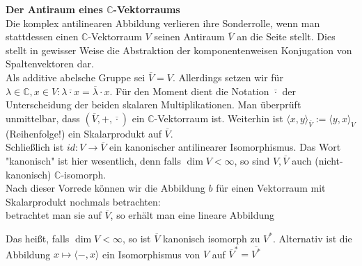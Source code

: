 \documentclass[12pt,a4paper]{article}
\theoremstyle{definition}
\theoremstyle{remark}
\renewcommand{\bar}[1]{\overline{#1}}
\begin{document}
	\textbf{Der Antiraum eines $\mathbb{C}$-Vektorraums} \\
	Die komplex antilinearen Abbildung verlieren ihre Sonderrolle, wenn man stattdessen einen $\mathbb{C}$-Vektorraum $V$ seinen Antiraum $\bar{V}$ an die Seite stellt. Dies stellt in gewisser Weise die Abstraktion der komponentenweisen Konjugation von Spaltenvektoren dar. \\
	Als additive abelsche Gruppe sei $\bar{V} = V$. Allerdings setzen wir für $\lambda \in \mathbb{C}, x \in V: \lambda \bar{\cdot} x = \bar{\lambda} \cdot x$. Für den Moment dient die Notation $\bar{\cdot}$ der Unterscheidung der beiden skalaren Multiplikationen. Man überprüft unmittelbar, dass $(\bar{V}, +, \bar{\cdot})$ ein $\mathbb{C}$-Vektorraum ist. Weiterhin ist $\langle x,y \rangle_{\bar{V}}:= \langle y,x \rangle_V$(Reihenfolge!) ein Skalarprodukt auf $\bar{V}$. \\
	Schließlich ist $id : V \rightarrow \bar{V}$ ein kanonischer antilinearer Isomorphismus. Das Wort "kanonisch" ist hier wesentlich, denn falls $\dim V < \infty$, so sind $V, \bar{V}$ auch (nicht-kanonisch) $\mathbb{C}$-isomorph. \\
	Nach dieser Vorrede können wir die Abbildung $b$ für einen Vektorraum mit Skalarprodukt nochmals betrachten: \\
	betrachtet man sie auf $\bar{V}$, so erhält man eine lineare Abbildung
	\begin{center}
	\end{center}
	Das heißt, falls $\dim V < \infty$, so ist $\bar{V}$ kanonisch isomorph zu $V^*$. Alternativ ist die Abbildung $x \mapsto \langle -,x \rangle$ ein Isomorphismus von $V$ auf $\bar{V}^* = \bar{V^*}$
	
	\newpage	
	
\end{document}

